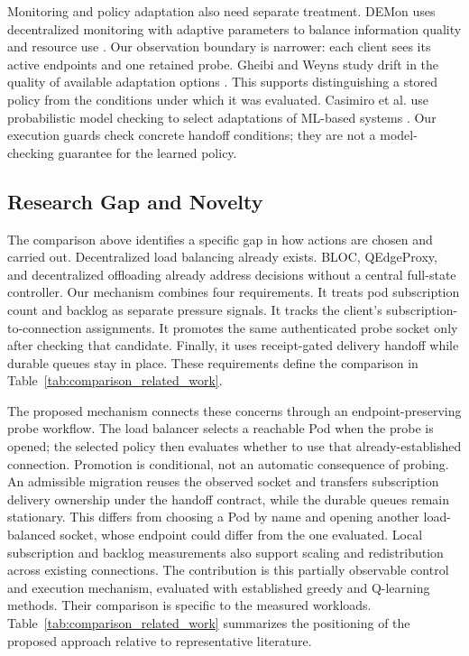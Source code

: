 Monitoring and policy adaptation also need separate treatment. DEMon uses
decentralized monitoring with adaptive parameters to balance information
quality and resource use \cite{Ilager2026DEMon}. Our observation boundary is
narrower: each client sees its active endpoints and one retained probe.
Gheibi and Weyns study drift in the quality of available adaptation options
\cite{Gheibi2024AdaptationDrift}. This supports distinguishing a stored policy
from the conditions under which it was evaluated. Casimiro et al. use
probabilistic model checking to select adaptations of ML-based systems
\cite{Casimiro2024ModelChecking}. Our execution guards check concrete handoff
conditions; they are not a model-checking guarantee for the learned policy.

\subsection{Research Gap and Novelty}

The comparison above identifies a specific gap in how actions are chosen and
carried out. Decentralized load balancing already exists. BLOC, QEdgeProxy, and
decentralized offloading already address decisions without a central
full-state controller. Our mechanism combines four requirements. It treats
pod subscription count and backlog as separate pressure signals. It tracks
the client's subscription-to-connection assignments. It promotes the same
authenticated probe socket only after checking that candidate. Finally, it
uses receipt-gated delivery handoff while durable queues stay in place.
These requirements
define the comparison in Table~\ref{tab:comparison_related_work}.

The proposed mechanism connects these concerns through an endpoint-preserving
probe workflow. The load balancer selects a reachable Pod when the probe is
opened; the selected policy then evaluates whether to use that already-established connection.
Promotion is conditional, not an automatic consequence of probing. An
admissible migration reuses the observed socket and transfers subscription
delivery ownership under the handoff contract, while the durable queues remain
stationary. This differs from choosing a Pod by name and opening another
load-balanced socket, whose endpoint could differ from the one evaluated.
Local subscription and backlog measurements also support scaling and
redistribution across existing connections. The contribution is this
partially observable control and execution mechanism, evaluated with established
greedy and Q-learning methods. Their comparison is specific to the measured workloads.
Table~\ref{tab:comparison_related_work} summarizes the
positioning of the proposed approach relative to representative literature.

